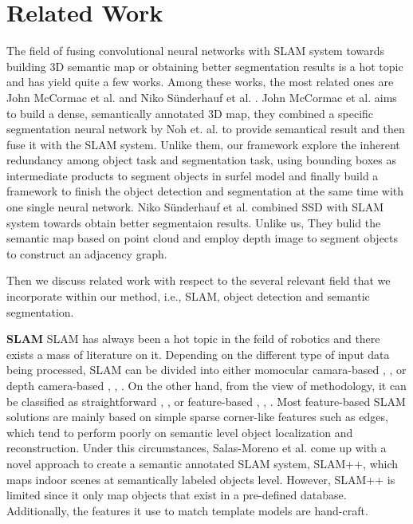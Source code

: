 \documentclass[conference]{IEEEtran}
\begin{document}
\section{\textbf{Related Work}}

{\color{blue}The field of fusing convolutional neural networks with SLAM system towards building 3D semantic map or obtaining better segmentation results is a hot topic and has yield quite a few works. Among these works, the most related ones are John McCormac et al. \cite{McCormac2017} and Niko S{\"u}nderhauf  et al. \cite{Suenderhauf2017}. John McCormac et al. \cite{McCormac2017} aims to build a dense, semantically annotated 3D map, they combined a specific segmentation neural network by Noh et. al. to provide semantical result and then fuse it with the SLAM system. Unlike them, our framework explore the inherent redundancy among object task and segmentation task, using bounding boxes as intermediate products to segment objects in surfel model and finally build a framework to finish the object detection and segmentation at the same time with one single neural network. Niko S{\"u}nderhauf  et al. \cite{Suenderhauf2017} combined SSD \cite{Liu2016} with SLAM system towards obtain better segmentaion results. Unlike us, They bulid the semantic map based on point cloud and employ depth image to segment objects to construct an adjacency graph.}

Then we discuss related work with respect to the several relevant field that we incorporate within our method, i.e., SLAM, object detection and semantic segmentation.

\textbf{SLAM} SLAM has always been a hot topic in the feild of robotics and there exists a mass of literature on it. Depending on the different  type of input data being processed, SLAM can be divided into either momocular camara-based \cite{Engel14lsd-slam:large-scale}, \cite{Mur-Artal2015}, \cite{Newcombea} or depth camera-based \cite{Keller13real-time3d}, \cite{Whelan_real-timelarge}, \cite{Newcombe}. On the other hand, from the view of methodology, it can be classified as straightforward \cite{Engel}, \cite{Engel14lsd-slam:large-scale}, \cite{Newcombea} or feature-based \cite{Klein2007}, \cite{Klein08improvingthe}, \cite{Mur-Artal2015}. Most feature-based SLAM solutions are mainly based on simple sparse corner-like features such as edges, which tend to perform poorly on semantic level object localization and reconstruction. Under this circumstances, Salas-Moreno et al. \cite{Salas-moreno} come up with a novel approach to create a  semantic annotated SLAM system, SLAM++, which maps indoor scenes at semantically labeled objects level. However, SLAM++ is limited since it only map objects that  exist in a pre-defined database. Additionally, the features it use to match template models are hand-craft.
\end{document}
